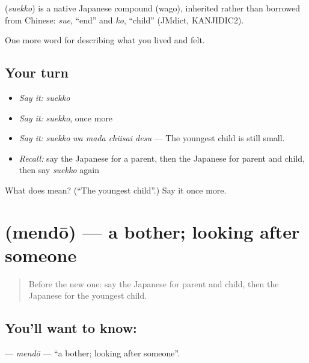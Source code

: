 \begin{cousinweb}
\textbf{} (\emph{suekko}) is a native Japanese compound (wago), inherited rather than borrowed from Chinese: \emph{sue}, \textquotedblleft{}end\textquotedblright{} and \emph{ko}, \textquotedblleft{}child\textquotedblright{} (JMdict, KANJIDIC2).
\end{cousinweb}

\begin{grammarlens}[title={What you've built}]
One more word for describing what you lived and felt.
\end{grammarlens}

\subsection*{Your turn}
\begin{itemize}
\raggedright
  \item \emph{Say it:} \emph{suekko}
  \item \emph{Say it:} \emph{suekko}, once more
  \item \emph{Say it:} \emph{suekko wa mada chiisai desu} — The youngest child is still small.
  \item \emph{Recall:} say the Japanese for a parent, then the Japanese for parent and child, then say \emph{suekko} again
\end{itemize}

\begin{tcolorbox}[breakable,colback=teal!4,colframe=teal!35!black,title={Before you move on}]
What does  mean? (\textquotedblleft{}The youngest child\textquotedblright{}.) Say it once more.
\end{tcolorbox}
\section[\texorpdfstring{\ja{めんどう} (mendō)}{めんどう (mendō)}]{ (mendō) — a bother; looking after someone}

\label{lesson:JA-C477-mendou}



\begin{quote}
Before the new one: say the Japanese for parent and child, then the Japanese for the youngest child.
\end{quote}

\subsection*{You'll want to know: }
\textbf{} — \emph{mendō} — \textquotedblleft{}a bother; looking after someone\textquotedblright{}.

